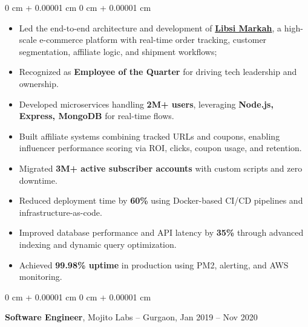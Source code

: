 \documentclass[10pt, letterpaper]{article}
\newenvironment{highlights}{
    \begin{itemize}[
        topsep=0.10 cm,
        parsep=0.10 cm,
        partopsep=0pt,
        itemsep=0pt,
        leftmargin=0 cm + 10pt
    ]
}{
    \end{itemize}
} %
\newenvironment{onecolentry}{
    \begin{adjustwidth}{
        0 cm + 0.00001 cm
    }{
        0 cm + 0.00001 cm
    }
}{
    \end{adjustwidth}
} %
\newenvironment{twocolentry}[2][]{
    \onecolentry
    \def\secondColumn{#2}
    \setcolumnwidth{\fill, 4.5 cm}
    \begin{paracol}{2}
}{
    \switchcolumn \raggedleft \secondColumn
    \end{paracol}
    \endonecolentry
} %
\begin{document}
        \vspace{0.10 cm}
        \begin{onecolentry}
            \begin{highlights}
                \item Led the end-to-end architecture and development of \href{https://libsimarkah.com/}{\textbf{Libsi Markah}}, a high-scale e-commerce platform with real-time order tracking, customer segmentation, affiliate logic, and shipment workflows;
                \item Recognized as \textbf{Employee of the Quarter} for driving tech leadership and ownership.
                \item Developed microservices handling \textbf{2M+ users}, leveraging \textbf{Node.js, Express, MongoDB} for real-time flows.
                \item Built affiliate systems combining tracked URLs and coupons, enabling influencer performance scoring via ROI, clicks, coupon usage, and retention.
                \item Migrated \textbf{3M+ active subscriber accounts} with custom scripts and zero downtime.
                \item Reduced deployment time by \textbf{60\%} using Docker-based CI/CD pipelines and infrastructure-as-code.
                \item Improved database performance and API latency by \textbf{35\%} through advanced indexing and dynamic query optimization.
                \item Achieved \textbf{99.98\% uptime} in production using PM2, alerting, and AWS monitoring.


            \end{highlights}
        \end{onecolentry}


        \vspace{0.2 cm}

        \begin{twocolentry}{
            Jan 2019 – Nov 2020
        }
            \textbf{Software Engineer}, Mojito Labs -- Gurgaon, \end{twocolentry}
\end{document}

